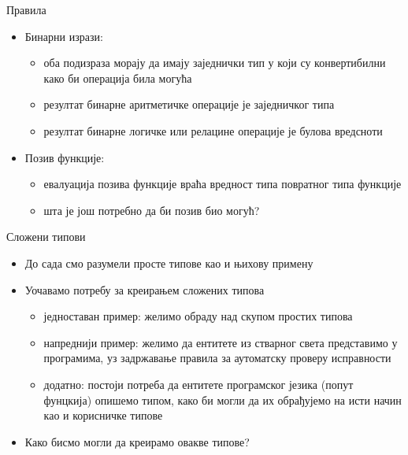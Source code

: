 \documentclass[xcolor=table]{beamer}
\begin{document}
    \begin{frame}{Правила}
        \begin{itemize}
            \item Бинарни изрази:
            \begin{itemize}
                \item оба подизраза морају да имају заједнички тип у који су конвертибилни како би операција била могућа
                \item резултат бинарне аритметичке операције је заједничког типа
                \item резултат бинарне логичке или релацине операције је булова вредсноти
            \end{itemize}
            \item Позив функције:
            \begin{itemize}
                \item евалуација позива функције враћа вредност типа повратног типа функције
                \item шта је још потребно да би позив био могућ?
            \end{itemize}
        \end{itemize}
    \end{frame}

    \begin{frame}{Сложени типови}
        \begin{itemize}
            \item До сада смо разумели просте типове као и њихову примену
            \item Уочавамо потребу за креирањем сложених типова
            \begin{itemize}
                \item једноставан пример: желимо обраду над скупом простих типова
                \item напреднији пример: желимо да ентитете из стварног света представимо у програмима, уз задржавање правила за аутоматску проверу исправности
                \item додатно: постоји потреба да ентитете програмског језика (попут фунцкија) опишемо типом, како би могли да их обрађујемо на исти начин као и корисничке типове
            \end{itemize}
            \item Како бисмо могли да креирамо овакве типове?
        \end{itemize}
    \end{frame}
\end{document}
